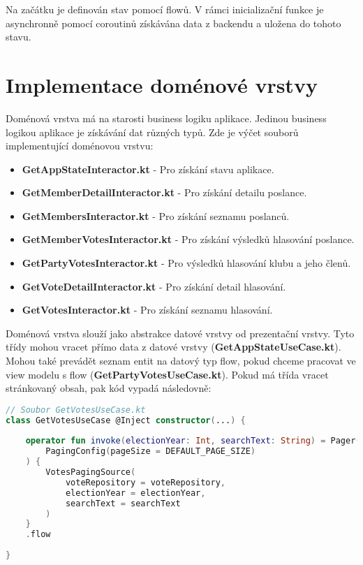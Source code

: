 \noindent Na začátku je definován stav pomocí flowů. V rámci inicializační funkce je asynchronně pomocí coroutinů získávána data z backendu a uložena do tohoto stavu. 

\section {Implementace doménové vrstvy}
Doménová vrstva má na starosti business logiku aplikace. Jedinou business logikou aplikace je získávání dat různých typů. Zde je výčet souborů implementující doménovou vrstvu:

\begin{itemize}
	\item \textbf{GetAppStateInteractor.kt} - Pro získání stavu aplikace.
	\item \textbf{GetMemberDetailInteractor.kt} - Pro získání detailu poslance.
	\item \textbf{GetMembersInteractor.kt} - Pro získání seznamu poslanců.
	\item \textbf{GetMemberVotesInteractor.kt} - Pro získání výsledků hlasování poslance.
	\item \textbf{GetPartyVotesInteractor.kt} - Pro výsledků hlasování klubu a jeho členů.
	\item \textbf{GetVoteDetailInteractor.kt} - Pro získání detail hlasování.
	\item \textbf{GetVotesInteractor.kt} - Pro získání seznamu hlasování.
\end{itemize}

\noindent Doménová vrstva slouží jako abstrakce datové vrstvy od prezentační vrstvy. Tyto třídy mohou vracet přímo data z datové vrstvy (\textbf{GetAppStateUseCase.kt}). Mohou také prevádět seznam entit na datový typ flow, pokud chceme pracovat ve view modelu s flow \linebreak (\textbf{GetPartyVotesUseCase.kt}). Pokud má třída vracet stránkovaný obsah, pak kód vypadá následovně:

\begin{lstlisting}[caption={Ukázka využití třídy doménové vrstvy pro získání stránkovaného seznamu hlasování}, label={lst:use-case-vote}, tabsize=2, language=Kotlin]
// Soubor GetVotesUseCase.kt
class GetVotesUseCase @Inject constructor(...) {
	
	operator fun invoke(electionYear: Int, searchText: String) = Pager(
		PagingConfig(pageSize = DEFAULT_PAGE_SIZE)
	) {
		VotesPagingSource(
			voteRepository = voteRepository,
			electionYear = electionYear,
			searchText = searchText
		)
	}
	.flow
	
}
\end{lstlisting}


